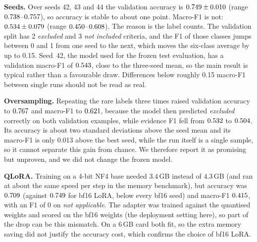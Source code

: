 \textbf{Seeds.} Over seeds 42, 43 and 44 the validation accuracy is $0.749\pm0.010$ (range
$0.738$--$0.757$), so accuracy is stable to about one point. Macro-F1 is not:
$0.534\pm0.079$ (range $0.450$--$0.608$). The reason is the label counts. The
validation split has 2 \emph{excluded} and 3 \emph{not included} criteria, and the F1 of those classes jumps
between 0 and 1 from one seed to the next, which moves the six-class average by up to 0.15. Seed~42, the model used for the frozen test
evaluation, has a validation macro-F1 of $0.543$, close to the three-seed mean, so the main result is typical
rather than a favourable draw. Differences below roughly 0.15 macro-F1 between single runs should not be read
as real.

\textbf{Oversampling.} Repeating the rare labels three times raised validation accuracy to $0.767$ and
macro-F1 to $0.621$, because the model then predicted \emph{excluded} correctly on both validation examples,
while evidence F1 fell from $0.532$ to $0.504$. Its accuracy is about two standard deviations above the
seed mean and its macro-F1 is only 0.013 above the best seed, while the run itself is a single sample, so it cannot separate this gain from chance. We
therefore report it as promising but unproven, and we did not change the frozen model.

\textbf{QLoRA.} Training on a 4-bit NF4 base needed $3.4$\,GB instead of $4.3$\,GB (and ran at about the same speed per step in the memory benchmark), but
accuracy was $0.709$ (against $0.749$ for bf16 LoRA, below every bf16 seed) and macro-F1 $0.415$,
with an F1 of 0 on \emph{not applicable}. The adapter was trained against the quantised weights and scored on
the bf16 weights (the deployment setting here), so part of the drop can be this mismatch. On a 6\,GB card both fit,
so the extra memory saving did not justify the accuracy cost, which confirms the choice of bf16 LoRA.

